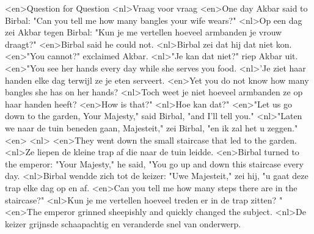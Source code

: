<en>Question for Question
<nl>Vraag voor vraag
<en>One day Akbar said to Birbal: "Can you tell me how many bangles your wife wears?"
<nl>Op een dag zei Akbar tegen Birbal: "Kun je me vertellen hoeveel armbanden je vrouw draagt?"
<en>Birbal said he could not.
<nl>Birbal zei dat hij dat niet kon.
<en>"You cannot?" exclaimed Akbar.
<nl>"Je kan dat niet?" riep Akbar uit.
<en>"You see her hands every day while she serves you food.
<nl>'Je ziet haar handen elke dag terwijl ze je eten serveert.
<en>Yet you do not know how many bangles she has on her hands?
<nl>Toch weet je niet hoeveel armbanden ze op haar handen heeft?
<en>How is that?"
<nl>Hoe kan dat?"
<en>"Let us go down to the garden, Your Majesty," said Birbal, "and I'll tell you."
<nl>"Laten we naar de tuin beneden gaan, Majesteit," zei Birbal, "en ik zal het u zeggen."
<en>
<nl>
<en>They went down the small staircase that led to the garden.
<nl>Ze liepen de kleine trap af die naar de tuin leidde.
<en>Birbal turned to the emperor: "Your Majesty," he said, "You go up and down this staircase every day.
<nl>Birbal wendde zich tot de keizer: "Uwe Majesteit," zei hij, "u gaat deze trap  elke dag op en af.
<en>Can you tell me how many steps there are in the staircase?"
<nl>Kun je me vertellen hoeveel treden er in de trap zitten? "
<en>The emperor grinned sheepishly and quickly changed the subject.
<nl>De keizer grijnsde schaapachtig en veranderde snel van onderwerp.
